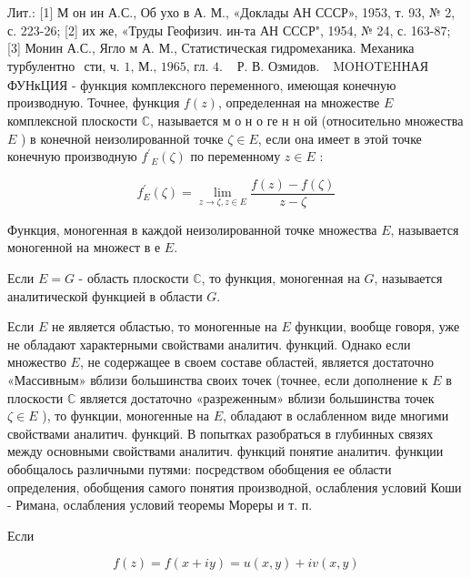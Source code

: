 \documentclass[10pt]{article}
\begin{document}
Лит.: [1] М он ин А.С., Об ухо в А. М., «Доклады АН СССР», 1953, т. 93, № 2, с. 223-26; [2] их же, «Труды Геофизич. ин-та АН СССР", 1954, № 24, с. 163-87; [3] Монин А.С., Ягло м А. М., Статистическая гидромеханика. Механика турбулентно$\begin{array}{ll}\text { сти, ч. 1, М., 1965, гл. } 4 . & \text { Р. В. Озмидов. }\end{array}$ MOHOTEHНАЯ ФУНкЦИЯ - функция комплексного переменного, имеющая конечную производную. Точнее, функция $f(z)$, определенная на множестве $E$ комплексной плоскости $\mathbb{C}$, называется м о н о ге н н ой (относительно множества $E$ ) в конечной неизолированной точке $\zeta \in E$, если она имеет в этой точке конечную производную $f^{\prime}{ }_{E}(\zeta)$ по переменному $z \in E$ :



\[

f_{E}^{\prime}(\zeta)=\lim _{z \rightarrow \zeta, z \in E} \frac{f(z)-f(\zeta)}{z-\zeta}

\]



Функция, моногенная в каждой неизолированной точке множества $E$, называется моногенной на множест в е $E$.



Если $E=G$ - область плоскости $\mathbb{C}$, то функция, моногенная на $G$, называется аналитической функцией в области $G$.



Если $E$ не является областью, то моногенные на $E$ функции, вообще говоря, уже не обладают характерными свойствами аналитич. функций. Однако если множество $E$, не содержащее в своем составе областей, является достаточно «Массивным» вблизи большинства своих точек (точнее, если дополнение к $E$ в плоскости $\mathbb{C}$ является достаточно «разреженным» вблизи большинства точек $\zeta \in E$ ), то функции, моногенные на $E$, обладают в ослабленном виде многими свойствами аналитич. функций. В попытках разобраться в глубинных связях между основными свойствами аналитич. функций понятие аналитич. функции обобщалось различными путями: посредством обобщения ее области определения, обобщения самого понятия производной, ослабления условий Коши - Римана, ослабления условий теоремы Мореры и т. п.



Если



\[

f(z)=f(x+i y)=u(x, y)+i v(x, y)

\]
\end{document}
